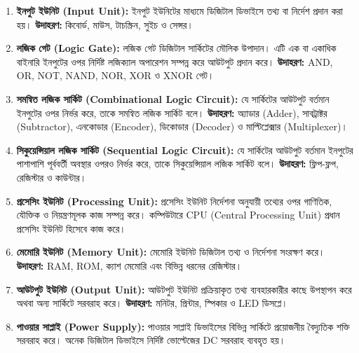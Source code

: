 \begin{enumerate}
    \item \textbf{ইনপুট ইউনিট (\textenglish{Input Unit}):}  
    ইনপুট ইউনিটের মাধ্যমে ডিজিটাল ডিভাইসে তথ্য বা নির্দেশ প্রদান করা হয়।  
    \textbf{উদাহরণ:} কিবোর্ড, মাউস, টাচস্ক্রিন, সুইচ ও সেন্সর।
    
    \item \textbf{লজিক গেট (\textenglish{Logic Gate}):}  
    লজিক গেট ডিজিটাল সার্কিটের মৌলিক উপাদান। এটি এক বা একাধিক বাইনারি ইনপুটের ওপর নির্দিষ্ট লজিক্যাল অপারেশন সম্পন্ন করে আউটপুট প্রদান করে।  
    \textbf{উদাহরণ:} \textenglish{AND, OR, NOT, NAND, NOR, XOR} ও \textenglish{XNOR} গেট।
    
    \item \textbf{সমন্বিত লজিক সার্কিট (\textenglish{Combinational Logic Circuit}):}  
    যে সার্কিটের আউটপুট বর্তমান ইনপুটের ওপর নির্ভর করে, তাকে সমন্বিত লজিক সার্কিট বলে।  
    \textbf{উদাহরণ:} অ্যাডার (\textenglish{Adder}), সাবট্রাক্টর (\textenglish{Subtractor}), এনকোডার (\textenglish{Encoder}), ডিকোডার (\textenglish{Decoder}) ও মাল্টিপ্লেক্সার (\textenglish{Multiplexer})।
    
    \item \textbf{সিকুয়েন্সিয়াল লজিক সার্কিট (\textenglish{Sequential Logic Circuit}):}  
    যে সার্কিটের আউটপুট বর্তমান ইনপুটের পাশাপাশি পূর্ববর্তী অবস্থার ওপরও নির্ভর করে, তাকে সিকুয়েন্সিয়াল লজিক সার্কিট বলে।  
    \textbf{উদাহরণ:} ফ্লিপ-ফ্লপ, রেজিস্টার ও কাউন্টার।
    
    \item \textbf{প্রসেসিং ইউনিট (\textenglish{Processing Unit}):}  
    প্রসেসিং ইউনিট নির্দেশনা অনুযায়ী তথ্যের ওপর গাণিতিক, যৌক্তিক ও নিয়ন্ত্রণমূলক কাজ সম্পন্ন করে। কম্পিউটারে \textenglish{CPU} (\textenglish{Central Processing Unit}) প্রধান প্রসেসিং ইউনিট হিসেবে কাজ করে।
    
    \item \textbf{মেমোরি ইউনিট (\textenglish{Memory Unit}):}  
    মেমোরি ইউনিট ডিজিটাল তথ্য ও নির্দেশনা সংরক্ষণ করে।  
    \textbf{উদাহরণ:} \textenglish{RAM, ROM}, ক্যাশ মেমোরি এবং বিভিন্ন ধরনের রেজিস্টার।
    
    \item \textbf{আউটপুট ইউনিট (\textenglish{Output Unit}):}  
    আউটপুট ইউনিট প্রক্রিয়াকৃত তথ্য ব্যবহারকারীর কাছে উপস্থাপন করে অথবা অন্য সার্কিটে সরবরাহ করে।  
    \textbf{উদাহরণ:} মনিটর, প্রিন্টার, স্পিকার ও \textenglish{LED} ডিসপ্লে।
    
    \item \textbf{পাওয়ার সাপ্লাই (\textenglish{Power Supply}):}  
    পাওয়ার সাপ্লাই ডিভাইসের বিভিন্ন সার্কিটে প্রয়োজনীয় বৈদ্যুতিক শক্তি সরবরাহ করে। অনেক ডিজিটাল ডিভাইসে নির্দিষ্ট ভোল্টেজের \textenglish{DC} সরবরাহ ব্যবহৃত হয়।
\end{enumerate}


